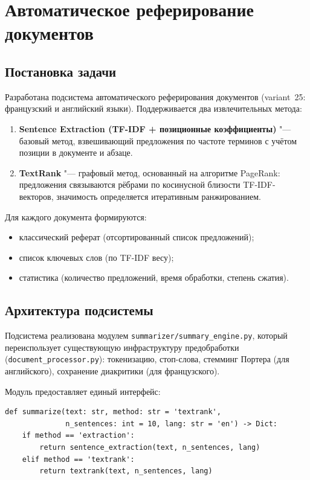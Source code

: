 \section{Автоматическое реферирование документов}
\label{sec:summarize}

\subsection{Постановка задачи}

Разработана подсистема автоматического реферирования документов (variant~25:
французский и английский языки). Поддерживается два извлечительных метода:

\begin{enumerate}
	\item \textbf{Sentence Extraction (TF-IDF + позиционные коэффициенты)} "--- базовый метод, взвешивающий предложения по частоте терминов с учётом позиции в документе и абзаце.
	\item \textbf{TextRank} "--- графовый метод, основанный на алгоритме PageRank: предложения связываются рёбрами по косинусной близости TF-IDF-векторов, значимость определяется итеративным ранжированием.
\end{enumerate}

Для каждого документа формируются:
\begin{itemize}
	\item классический реферат (отсортированный список предложений);
	\item список ключевых слов (по TF-IDF весу);
	\item статистика (количество предложений, время обработки, степень сжатия).
\end{itemize}

\subsection{Архитектура подсистемы}

Подсистема реализована модулем \texttt{summarizer/summary\_engine.py},
который переиспользует существующую инфраструктуру предобработки
(\texttt{document\_processor.py}): токенизацию, стоп-слова, стемминг
Портера (для английского), сохранение диакритики (для французского).

Модуль предоставляет единый интерфейс:

\begin{lstlisting}[caption={Публичный API модуля реферирования.},label={lst:summary_api}]
def summarize(text: str, method: str = 'textrank',
              n_sentences: int = 10, lang: str = 'en') -> Dict:
    if method == 'extraction':
        return sentence_extraction(text, n_sentences, lang)
    elif method == 'textrank':
        return textrank(text, n_sentences, lang)
\end{lstlisting}


